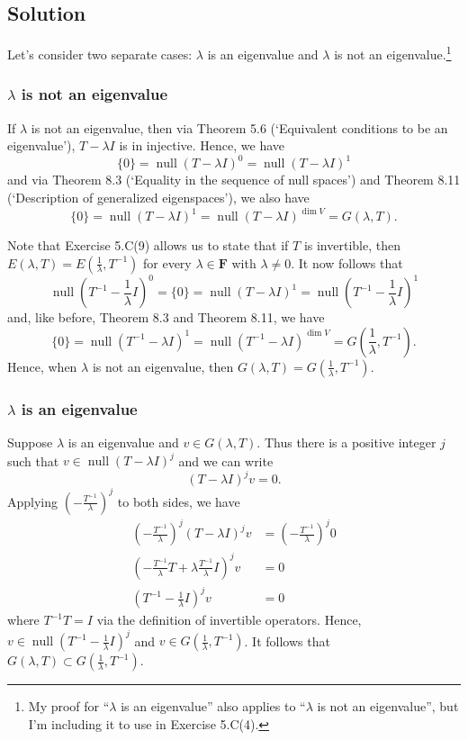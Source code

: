 \documentclass{article}
\begin{document}
\subsection*{Solution}
Let's consider two separate cases: $\lambda$ is an eigenvalue and $\lambda$ is not an eigenvalue.\footnote{
My proof for ``$\lambda$ is an eigenvalue'' also applies to ``$\lambda$ is not an eigenvalue'', but I'm including it to use in Exercise 5.C(4).
}

\subsubsection*{$\lambda$ is not an eigenvalue}
If $\lambda$ is not an eigenvalue, then via Theorem 5.6 (`Equivalent conditions to be an eigenvalue'), $T-\lambda I$ is in injective. 
Hence, we have
\[\{0\}=\operatorname{null}(T-\lambda I)^0=\operatorname{null}(T-\lambda I)^1\]
and via Theorem 8.3 (`Equality in the sequence of null spaces') and Theorem 8.11 (`Description of generalized eigenspaces'), we also have
\[\{0\}=\operatorname{null}(T-\lambda I)^1=\operatorname{null}(T-\lambda I)^{\operatorname{dim}V}=G(\lambda,T).\]

Note that Exercise 5.C(9) allows us to state that if $T$ is invertible, then $E(\lambda,T)=E(\frac{1}{\lambda},T^{-1})$ for every $\lambda\in\mathbf{F}$ with $\lambda\neq 0$. 
It now follows that 
\[\operatorname{null}(T^{-1}-\frac{1}{\lambda}I)^0=\{0\}=\operatorname{null}(T-\lambda I)^1=\operatorname{null}(T^{-1}-\frac{1}{\lambda}I)^1\]
and, like before, Theorem 8.3 and Theorem 8.11, we have
\[\{0\}=\operatorname{null}(T^{-1}-\lambda I)^1=\operatorname{null}(T^{-1}-\lambda I)^{\operatorname{dim}V}=G(\frac{1}{\lambda},T^{-1}).\]
Hence, when $\lambda$ is not an eigenvalue, then $G(\lambda,T)=G(\frac{1}{\lambda},T^{-1})$.

\subsubsection*{$\lambda$ is an eigenvalue}
Suppose $\lambda$ is an eigenvalue and $v\in G(\lambda,T)$. Thus there is a positive integer $j$ such that $v\in\operatorname{null}(T-\lambda I)^j$ and we can write 
\[(T-\lambda I)^jv=0.\]
Applying $(-\frac{T^{-1}}{\lambda})^{j}$ to both sides, we have
\begin{align*}
    (-\frac{T^{-1}}{\lambda})^{j}(T-\lambda I)^jv&=(-\frac{T^{-1}}{\lambda})^{j}0 \\
    (-\frac{T^{-1}}{\lambda}T+\lambda\frac{T^{-1}}{\lambda}I)^jv&=0\\
    (T^{-1}-\frac{1}{\lambda}I)^jv&=0
\end{align*}
where $T^{-1}T=I$ via the definition of invertible operators. 
Hence, $v\in\operatorname{null}(T^{-1}-\frac{1}{\lambda}I)^j$ and $v\in G(\frac{1}{\lambda},T^{-1})$. 
It follows that $G(\lambda,T)\subset G(\frac{1}{\lambda},T^{-1})$.
\end{document}
